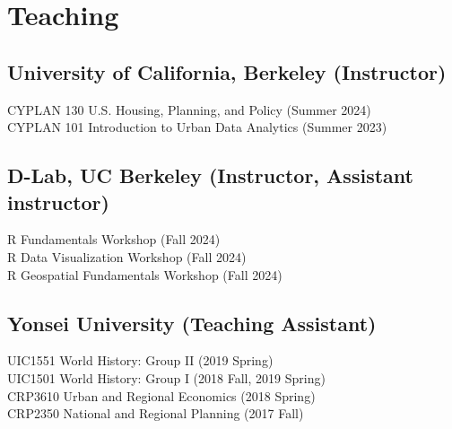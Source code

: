 \documentclass[12pt,letterpaper]{report}
\begin{document}
 \section*{Teaching}
    \subsection*{University of California, Berkeley (Instructor)}
      CYPLAN 130 U.S. Housing, Planning, and Policy (Summer 2024)\\
      CYPLAN 101 Introduction to Urban Data Analytics (Summer 2023)
    \subsection*{D-Lab, UC Berkeley (Instructor, Assistant instructor)}
      R Fundamentals Workshop (Fall 2024)\\
      R Data Visualization Workshop (Fall 2024)\\
      R Geospatial Fundamentals Workshop (Fall 2024)
    \subsection*{Yonsei University (Teaching Assistant)}
      UIC1551 World History: Group II (2019 Spring)\\
      UIC1501 World History: Group I  (2018 Fall, 2019 Spring)\\
      CRP3610 Urban and Regional Economics (2018 Spring)\\
      CRP2350 National and Regional Planning (2017 Fall)

  
\end{document}

